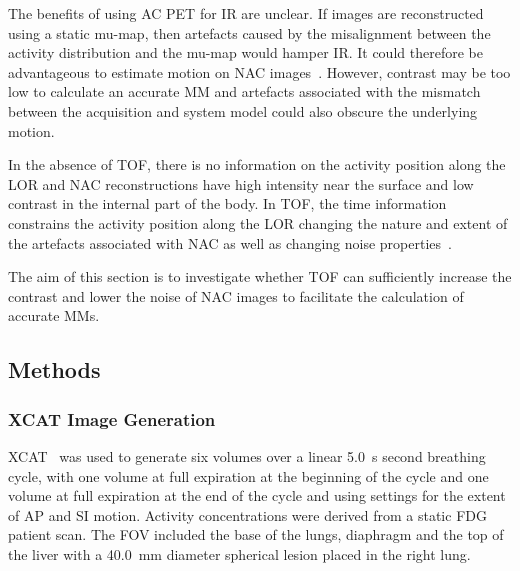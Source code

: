         The benefits of using \gls{AC} \gls{PET} for \gls{IR} are unclear. If images are reconstructed using a static \gls{mu-map}, then artefacts caused by the misalignment between the activity distribution and the \gls{mu-map} would hamper \gls{IR}. It could therefore be advantageous to estimate motion on \gls{NAC} images~. However, contrast may be too low to calculate an accurate \gls{MM} and artefacts associated with the mismatch between the acquisition and system model could also obscure the underlying motion. 
        
        In the absence of \gls{TOF}, there is no information on the activity position along the \gls{LOR} and \gls{NAC} reconstructions have high intensity near the surface and low contrast in the internal part of the body. In \gls{TOF}, the time information constrains the activity position along the \gls{LOR} changing the nature and extent of the artefacts associated with \gls{NAC} as well as changing noise properties~.
        
        The aim of this section is to investigate whether \gls{TOF} can sufficiently increase the contrast and lower the noise of \gls{NAC} images to facilitate the calculation of accurate \gls{MM}s.
        
        \subsection{Methods} \label{sec:impact_of_tof_on_respiratory_motion_modelling_using_nac_pet_methods}
            \subsubsection{XCAT Image Generation} \label{sec:impact_of_tof_on_respiratory_motion_modelling_using_nac_pet_methods_xcat_image_generation}
                \gls{XCAT}~ was used to generate six volumes over a linear \SI{5.0}{\second} second breathing cycle, with one volume at full expiration at the beginning of the cycle and one volume at full expiration at the end of the cycle and using settings for the extent of \gls{AP} and \gls{SI} motion. Activity concentrations were derived from a static \gls{FDG} patient scan. The \gls{FOV} included the base of the lungs, diaphragm and the top of the liver with a \SI{40.0}{\milli\metre} diameter spherical lesion placed in the right lung.
            

